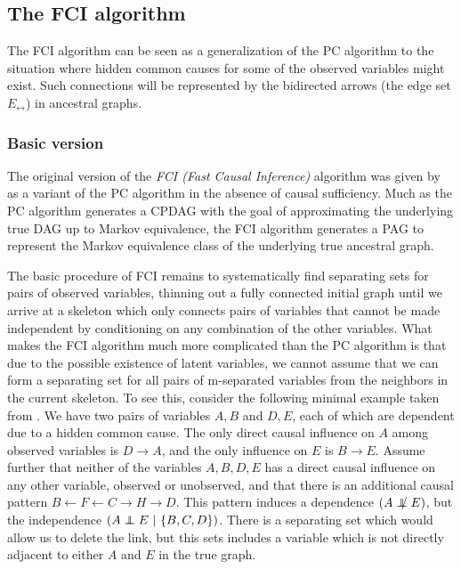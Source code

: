 \subsection{The FCI algorithm}\label{sec:3.2.4}
The FCI algorithm can be seen as a generalization of the PC algorithm to the situation where hidden common causes for some of the observed variables might exist. Such connections will be represented by the bidirected arrows (the edge set $E_\leftrightarrow$) in ancestral graphs.

\subsubsection{Basic version}
The original version of the \textit{FCI (Fast Causal Inference)} algorithm was given by \cite{spirtes_ea_2000} as a variant of the PC algorithm in the absence of causal sufficiency. Much as the PC algorithm generates a CPDAG with the goal of approximating the underlying true DAG up to Markov equivalence, the FCI algorithm generates a PAG to represent the Markov equivalence class of the underlying true ancestral graph.

The basic procedure of FCI remains to systematically find separating sets for pairs of observed variables, thinning out a fully connected initial graph until we arrive at a skeleton which only connects pairs of variables that cannot be made independent by conditioning on any combination of the other variables. What makes the FCI algorithm much more complicated than the PC algorithm is that due to the possible existence of latent variables, we cannot assume that we can form a separating set for all pairs of m-separated variables from the neighbors in the current skeleton. To see this, consider the following minimal example taken from \citet[p.129]{spirtes_ea_2000}. We have two pairs of variables $A,B$ and $D,E$, each of which are dependent due to a hidden common cause. The only direct causal influence on $A$ among observed variables is $D \rightarrow A$, and the only influence on $E$ is $B \rightarrow E$. Assume further that neither of the variables $A,B,D,E$ has a direct causal influence on any other 
variable, observed or unobserved, and that there is an additional causal pattern $B \leftarrow F \leftarrow C \rightarrow H \rightarrow D$. This pattern induces a dependence $(A \notindep E)$, but the independence $(A \indep E\ |\ \{B,C,D\})$. There is a separating set which would allow us to delete the link, but this sets includes a variable which is not directly adjacent to either $A$ and $E$ in the true graph.

